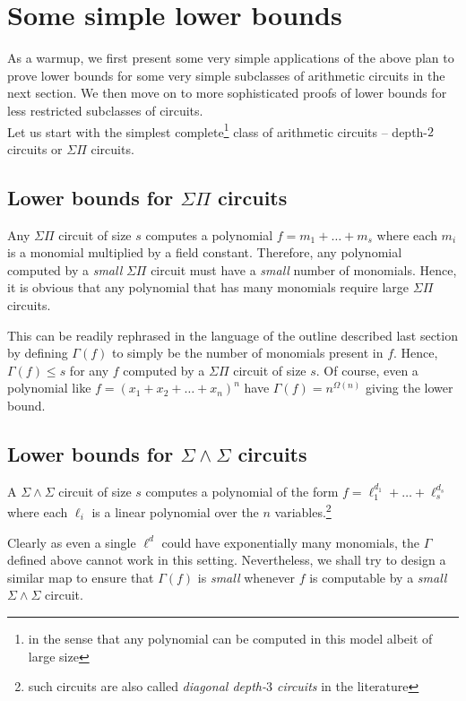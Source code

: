 \chapter{Some simple lower bounds}\label{chap:simpleLBs}


As a warmup, we first present some very simple applications of the above plan to prove lower bounds for some very simple subclasses of arithmetic circuits in the next section. 
We then move on to more sophisticated proofs of lower bounds for less restricted subclasses of circuits. \\

Let us start with the simplest complete\footnote{in the sense that any polynomial can be computed in this model albeit of large size}  class of arithmetic circuits -- depth-$2$ circuits or $\Sigma\Pi$ circuits. 

\section{Lower bounds for $\Sigma\Pi$ circuits}

Any $\Sigma\Pi$ circuit of size $s$ computes a polynomial $f = m_1 + \dots + m_s$ where each $m_i$ is a monomial multiplied by a field constant. 
Therefore, any polynomial computed by a \emph{small} $\Sigma\Pi$ circuit must have a \emph{small} number of monomials. 
Hence, it is obvious that any polynomial that has many monomials require large $\Sigma\Pi$ circuits. 

This can be readily rephrased in the language of the outline described last section by defining $\Gamma(f)$ to simply be the number of monomials present in $f$. 
Hence, $\Gamma(f)\leq s$ for any $f$ computed by a $\Sigma\Pi$ circuit of size $s$. 
Of course, even a polynomial like $f = (x_1 + x_2+\dots + x_n)^n$  have $\Gamma(f) = n^{\Omega(n)}$ giving the lower bound. 

\section{Lower bounds for $\Sigma\!\wedge\!\Sigma$ circuits}

A $\Sigma\!\wedge\!\Sigma$ circuit of size $s$ computes a polynomial of the form $f = \ell_1^{d_1} + \dots + \ell_s^{d_s}$ where each $\ell_i$ is a linear polynomial over the $n$ variables.\footnote{such circuits are also called \emph{diagonal depth-$3$ circuits} in the literature}

Clearly as even a single $\ell^d$ could have exponentially many monomials, the $\Gamma$ defined above cannot work in this setting. 
Nevertheless, we shall try to design a similar map to ensure that $\Gamma(f)$ is \emph{small} whenever $f$ is computable by a \emph{small} $\Sigma\!\wedge\!\Sigma$ circuit. \\

